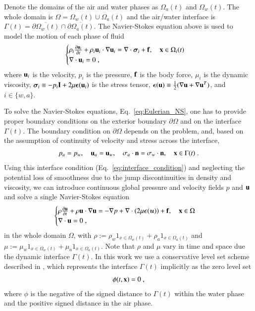 \documentclass[final,3p,times]{elsarticle}
\begin{document}
Denote the domains of the air and water phases as 
$\Omega_a(t)$ and $\Omega_w(t)$. The whole domain is $\Omega = \Omega_w(t)\cup\Omega_a(t)$ and the air/water interface is $\Gamma(t) = \overline{\partial\Omega_w(t)}\cap \overline{\partial\Omega_a(t)}$. 
The Navier-Stokes equation above is used to model the motion of each phase of fluid
\begin{align}
   \begin{cases}
      \rho_i\frac{\partial \mathbf{u}_i}{\partial t} + \rho_i \mathbf{u}_i\cdot\nabla\mathbf{u}_i = \nabla\cdot \bm{\sigma}_i+\mathbf{f},\quad \mathbf{x}\in\Omega_i(t)\\
      \nabla\cdot\mathbf{u}_i = 0 \; ,
   \end{cases}\label{eq:Eulerian_NS}
\end{align}
where $\mathbf{u}_i$ is the velocity, $p_i$ is the pressure, $\mathbf{f}$ is the body force, 
$\mu_i$ is the dynamic viscosity, $\bm{\sigma}_i \equiv -p_i\mathbf{I}+ 2\mu\bm{\epsilon}(\mathbf{u}_i)$ is the stress tensor, 
$\bm{\epsilon}(\mathbf{u})\equiv \frac{1}{2}(\nabla\mathbf{u}+\nabla\mathbf{u}^T)$, 
and $i\in \{w,a\}$. 

To solve the Navier-Stokes equations, Eq.~\eqref{eq:Eulerian_NS}, 
one has to provide proper boundary conditions on the exterior boundary $\partial\Omega$ and on the interface 
$\Gamma(t)$. The boundary condition on $\partial\Omega$
depends on the problem, and, based on the assumption of continuity of velocity and stress across the interface, 
\begin{align}
\label{eq:interface_condition}
   p_a = p_w, \quad \mathbf{u}_a = \mathbf{u}_w, \quad {\bf\sigma}_a \cdot \mathbf{n} = {\bf\sigma}_w \cdot \mathbf{n},\quad \mathbf{x}\in\Gamma(t) \; .
\end{align}
Using this interface condition (Eq.~\eqref{eq:interface_condition}) and neglecting the potential loss of smoothness due to the jump discontinuities in density and viscosity, we can introduce continuous global pressure and velocity fields $p$ and $\mathbf{u}$ and solve a single Navier-Stokes equation
\begin{align*}
   \begin{cases}
      \rho\frac{\partial \mathbf{u}}{\partial t} + \rho\mathbf{u}\cdot\nabla\mathbf{u} = -\nabla p + \nabla\cdot (2\mu\bm{\epsilon}(\bm u))+\mathbf{f},\quad \mathbf{x}\in\Omega\\
      \nabla\cdot\mathbf{u} = 0 \; ,
   \end{cases}
\end{align*}
in the whole domain $\Omega$, with $\rho := \rho_w 1_{x\in\Omega_w(t)}+\rho_a 1_{x\in\Omega_a(t)}$ and 
   $\mu := \mu_w 1_{x\in\Omega_w(t)}+\mu_a 1_{x\in\Omega_a(t)}$. Note that $\rho$ and $\mu$ vary in time and space due the dynamic interface $\Gamma(t)$. In this work we use a conservative level set scheme described in \cite{KAFB11}, which represents the interface $\Gamma(t)$ implicitly as the zero level set
\begin{equation}
\phi(t,\mathbf{x}) = 0 \; ,
\end{equation}
where $\phi$ is the negative of the signed distance to $\Gamma(t)$ within the water phase and the positive signed distance in the air phase.
\end{document}
